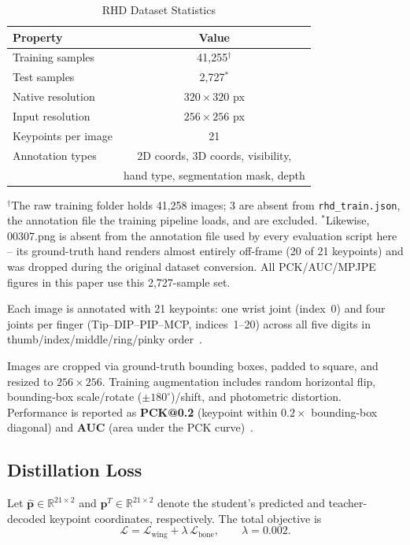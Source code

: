\documentclass[11pt,conference,a4paper]{APSIPA2026}
\begin{document}
\begin{table}[h]
\centering
\caption{RHD Dataset Statistics}
\label{tab:rhd_stats}
\renewcommand{\arraystretch}{0.95}
\begin{tabular}{lc}
\hline
\textbf{Property} & \textbf{Value} \\
\hline
Training samples     & 41,255$^{\dagger}$ \\
Test samples         & 2,727$^{*}$  \\
Native resolution    & $320 \times 320$ px \\
Input resolution     & $256 \times 256$ px \\
Keypoints per image  & 21 \\
Annotation types     & 2D coords, 3D coords, visibility, \\
                     & hand type, segmentation mask, depth \\
\hline
\end{tabular}
\vspace{2pt}
{\scriptsize $^{\dagger}$The raw training folder holds 41,258 images;
3 are absent from \texttt{rhd\_train.json}, the annotation file the
training pipeline loads, and are excluded.
$^{*}$Likewise, 00307.png is absent from the annotation file used by every
evaluation script here -- its ground-truth hand renders almost entirely
off-frame (20 of 21 keypoints) and was dropped during the original dataset
conversion. All PCK/AUC/MPJPE figures in this paper use this 2,727-sample
set.}
\end{table}

Each image is annotated with 21 keypoints: one wrist joint (index~0)
and four joints per finger (Tip--DIP--PIP--MCP, indices~1--20) across
all five digits in thumb/index/middle/ring/pinky
order~\cite{mmpose2020}.

Images are cropped via ground-truth bounding boxes, padded to square,
and resized to $256{\times}256$. Training augmentation includes random
horizontal flip, bounding-box scale/rotate ($\pm180^{\circ}$)/shift,
and photometric distortion. Performance is reported as
\textbf{PCK@0.2} (keypoint within $0.2\times$ bounding-box diagonal)
and \textbf{AUC} (area under the PCK curve)~\cite{zimmermann2017learning}.

\subsection{Distillation Loss}

Let $\hat{\mathbf{p}}\in\mathbb{R}^{21\times 2}$ and
$\mathbf{p}^{T}\in\mathbb{R}^{21\times 2}$ denote the student's
predicted and teacher-decoded keypoint coordinates, respectively.
The total objective is
\begin{equation}
    \mathcal{L} = \mathcal{L}_{\mathrm{wing}} +
    \lambda\,\mathcal{L}_{\mathrm{bone}}, \qquad \lambda=0.002.
    \label{eq:loss}
\end{equation}
\end{document}
